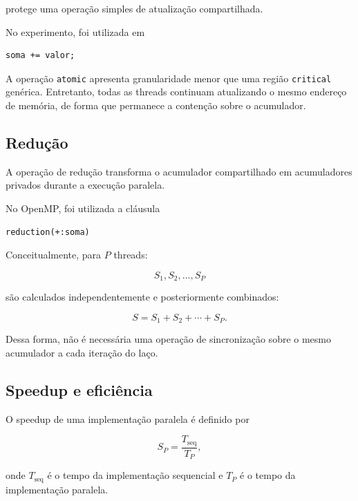 protege uma operação simples de atualização compartilhada.

No experimento, foi utilizada em

\begin{verbatim}
soma += valor;
\end{verbatim}

A operação \texttt{atomic} apresenta granularidade menor que uma região
\texttt{critical} genérica. Entretanto, todas as threads continuam
atualizando o mesmo endereço de memória, de forma que permanece a contenção
sobre o acumulador.


\subsection{Redução}

A operação de redução transforma o acumulador compartilhado em acumuladores
privados durante a execução paralela.

No OpenMP, foi utilizada a cláusula

\begin{verbatim}
reduction(+:soma)
\end{verbatim}

Conceitualmente, para \(P\) threads:

\begin{equation}
    S_1,S_2,\ldots,S_P
\end{equation}

são calculados independentemente e posteriormente combinados:

\begin{equation}
    S =
    S_1+S_2+\cdots+S_P.
\end{equation}

Dessa forma, não é necessária uma operação de sincronização sobre o mesmo
acumulador a cada iteração do laço.


\subsection{Speedup e eficiência}

O speedup de uma implementação paralela é definido por

\begin{equation}
    S_P =
    \frac{T_{\text{seq}}}{T_P},
    \label{eq:atvd06-speedup}
\end{equation}

onde \(T_{\text{seq}}\) é o tempo da implementação sequencial e \(T_P\) é o
tempo da implementação paralela.

